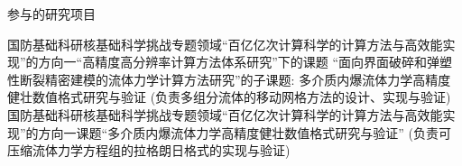 
\begin{rubric}{\songti 参与的研究项目}

%
\entry*[2019-2020] 国防基础科研核基础科学挑战专题领域``百亿亿次计算科学的计算方法与高效能实现”的方向一``高精度高分辨率计算方法体系研究”下的课题
                   ``面向界面破碎和弹塑性断裂精密建模的流体力学计算方法研究”的子课题:
                   多介质内爆流体力学高精度健壮数值格式研究与验证
                   (负责多组分流体的移动网格方法的设计、实现与验证)
%
\entry*[2016-2018] 国防基础科研核基础科学挑战专题领域``百亿亿次计算科学的计算方法与高效能实现”的方向一课题``多介质内爆流体力学高精度健壮数值格式研究与验证”
                   (负责可压缩流体力学方程组的拉格朗日格式的实现与验证)

\end{rubric}%